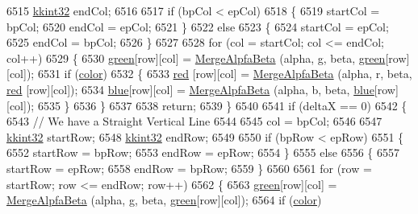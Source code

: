 \begin{DoxyCode}
6515     \hyperlink{namespace_k_k_b_a8fa4952cc84fda1de4bec1fbdd8d5b1b}{kkint32}  endCol;
6516 
6517     \textcolor{keywordflow}{if}  (bpCol < epCol)
6518     \{
6519       startCol = bpCol;
6520       endCol   = epCol;
6521     \}
6522     \textcolor{keywordflow}{else}
6523     \{
6524       startCol = epCol;
6525       endCol   = bpCol;
6526     \}
6527 
6528     \textcolor{keywordflow}{for}  (col = startCol;  col <= endCol;  col++)
6529     \{
6530       \hyperlink{class_k_k_b_1_1_raster_a2d2238911145488e226cd2e34fc8448c}{green}[row][col] = \hyperlink{_raster_8cpp_a35cd27498a34528ebe070556016152f5}{MergeAlpfaBeta} (alpha, g, beta, \hyperlink{class_k_k_b_1_1_raster_a2d2238911145488e226cd2e34fc8448c}{green}[row][col]);
6531       \textcolor{keywordflow}{if}  (\hyperlink{class_k_k_b_1_1_raster_a482384d89cc53fa4f36276307c746854}{color})
6532       \{
6533         \hyperlink{class_k_k_b_1_1_raster_a7fd39e0463c8477d0d0d26e11126d285}{red} [row][col] = \hyperlink{_raster_8cpp_a35cd27498a34528ebe070556016152f5}{MergeAlpfaBeta} (alpha, r, beta, \hyperlink{class_k_k_b_1_1_raster_a7fd39e0463c8477d0d0d26e11126d285}{red} [row][col]);
6534         \hyperlink{class_k_k_b_1_1_raster_a0265be7ea30f5b1f9d6310a79bee868b}{blue}[row][col] = \hyperlink{_raster_8cpp_a35cd27498a34528ebe070556016152f5}{MergeAlpfaBeta} (alpha, b, beta, \hyperlink{class_k_k_b_1_1_raster_a0265be7ea30f5b1f9d6310a79bee868b}{blue}[row][col]);
6535       \}
6536     \}
6537 
6538     \textcolor{keywordflow}{return};
6539   \}
6540 
6541   \textcolor{keywordflow}{if}  (deltaX == 0)
6542   \{
6543     \textcolor{comment}{// We have a Straight Vertical Line}
6544 
6545     col = bpCol;
6546     
6547     \hyperlink{namespace_k_k_b_a8fa4952cc84fda1de4bec1fbdd8d5b1b}{kkint32}  startRow;
6548     \hyperlink{namespace_k_k_b_a8fa4952cc84fda1de4bec1fbdd8d5b1b}{kkint32}  endRow;
6549 
6550     \textcolor{keywordflow}{if}  (bpRow < epRow)
6551     \{
6552       startRow = bpRow;
6553       endRow   = epRow;
6554     \}
6555     \textcolor{keywordflow}{else}
6556     \{
6557       startRow = epRow;
6558       endRow   = bpRow;
6559     \}
6560 
6561     \textcolor{keywordflow}{for}  (row = startRow;  row <= endRow;  row++)
6562     \{
6563       \hyperlink{class_k_k_b_1_1_raster_a2d2238911145488e226cd2e34fc8448c}{green}[row][col] = \hyperlink{_raster_8cpp_a35cd27498a34528ebe070556016152f5}{MergeAlpfaBeta} (alpha, g, beta, \hyperlink{class_k_k_b_1_1_raster_a2d2238911145488e226cd2e34fc8448c}{green}[row][col]);
6564       \textcolor{keywordflow}{if}  (\hyperlink{class_k_k_b_1_1_raster_a482384d89cc53fa4f36276307c746854}{color})

\end{DoxyCode}
